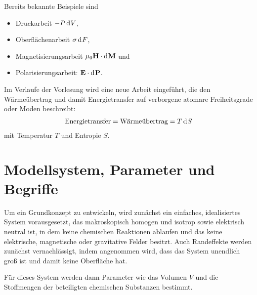 Bereits bekannte Beispiele sind
\begin{itemize}
    \item Druckarbeit $-P\mathop{\mathrm{d}^{}V}$,
    \item Oberflächenarbeit $\sigma\mathop{\mathrm{d}^{}F}$,
    \item Magnetisierungsarbeit $\mu_0\mathbf{H}\cdot\mathop{\mathrm{d}^{}\mathbf{M}}$ und
    \item Polarisierungsarbeit: $\mathbf{E}\cdot\mathop{\mathrm{d}^{}\mathbf{P}}$.
\end{itemize}
Im Verlaufe der Vorlesung wird eine neue Arbeit eingeführt, die den Wärmeübertrag und damit Energietransfer auf verborgene atomare Freiheitsgrade oder Moden beschreibt:
\begin{align*}
    \text{Energietransfer}=\text{Wärmeübertrag}=T\mathop{\mathrm{d}^{}S}
\end{align*}
mit Temperatur $T$ und Entropie $S$.



\section{Modellsystem, Parameter und Begriffe}

Um ein Grundkonzept zu entwickeln, wird zunächst ein einfaches, idealisiertes System vorausgesetzt, das makroskopisch homogen und isotrop sowie elektrisch neutral ist, in dem keine chemischen Reaktionen ablaufen und das keine elektrische, magnetische oder gravitative Felder besitzt. Auch Randeffekte werden zunächst vernachlässigt, indem angenommen wird, dass das System unendlich groß ist und damit keine Oberfläche hat.

Für dieses System werden dann Parameter wie das Volumen $V$ und die Stoffmengen der beteiligten chemischen Substanzen bestimmt.

